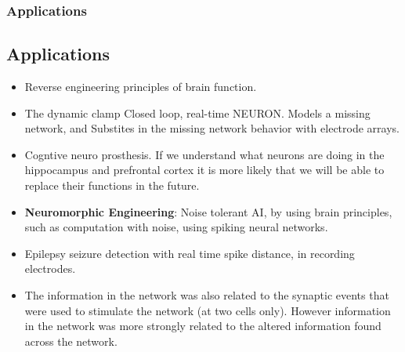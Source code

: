 \documentclass{beamer}
\begin{document}
\begin{frame}
\frametitle{Applications}
\subsection{Applications}
\begin{itemize}

\vfill \item Reverse engineering principles of brain function.

\vfill \item The dynamic clamp Closed loop, real-time NEURON. Models a missing network, and Substites in the missing network behavior with electrode arrays. 

\vfill \item Cogntive neuro prosthesis. If we understand what neurons are doing in the hippocampus and prefrontal cortex it is more likely that we will be able to replace their functions in the future.
\vfill \item \textbf{Neuromorphic Engineering}: Noise tolerant AI, by using brain principles, such as computation with noise, using spiking neural networks. 
 
\vfill \item Epilepsy seizure detection with real time spike distance, in recording electrodes.

\end{itemize}
\end{frame}


\begin{frame}
\begin{itemize}

\vfill \item The information in the network was also related to the synaptic events that were used to stimulate the network (at two cells only). However information in the network was more strongly related to the altered information found across the network.
\end{itemize}
\end{frame}
\end{document}
